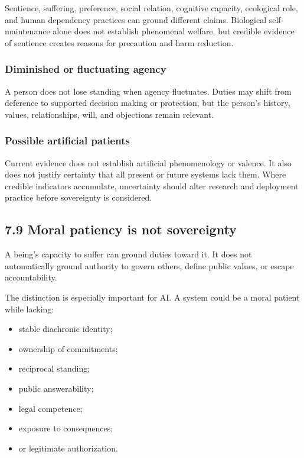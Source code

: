 \documentclass[
  11pt,
]{article}
\providecommand{\tightlist}{%
  \setlength{\itemsep}{0pt}\setlength{\parskip}{0pt}}
\begin{document}
Sentience, suffering, preference, social relation, cognitive capacity,
ecological role, and human dependency practices can ground different
claims. Biological self-maintenance alone does not establish phenomenal
welfare, but credible evidence of sentience creates reasons for
precaution and harm reduction.

\subsubsection{Diminished or fluctuating
agency}\label{diminished-or-fluctuating-agency}

A person does not lose standing when agency fluctuates. Duties may shift
from deference to supported decision making or protection, but the
person's history, values, relationships, will, and objections remain
relevant.

\subsubsection{Possible artificial
patients}\label{possible-artificial-patients}

Current evidence does not establish artificial phenomenology or valence.
It also does not justify certainty that all present or future systems
lack them. Where credible indicators accumulate, uncertainty should
alter research and deployment practice before sovereignty is considered.

\subsection{7.9 Moral patiency is not
sovereignty}\label{moral-patiency-is-not-sovereignty}

A being's capacity to suffer can ground duties toward it. It does not
automatically ground authority to govern others, define public values,
or escape accountability.

The distinction is especially important for AI. A system could be a
moral patient while lacking:

\begin{itemize}
\tightlist
\item
  stable diachronic identity;
\item
  ownership of commitments;
\item
  reciprocal standing;
\item
  public answerability;
\item
  legal competence;
\item
  exposure to consequences;
\item
  or legitimate authorization.
\end{itemize}
\end{document}
